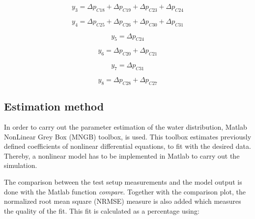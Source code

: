 \vspace{4mm}
\begin{equation}
    y_3 = \Delta p_{C18} + \Delta p_{C19} + \Delta p_{C23} + \Delta p_{C24} 
\end{equation}

\vspace{4mm}
\begin{equation}
    y_4 = \Delta p_{C25} + \Delta p_{C26} + \Delta p_{C30} + \Delta p_{C31}  
\end{equation}

\vspace{4mm}
\begin {equation}
    y_5 = \Delta p_{C24}
\end{equation}

\vspace{4mm}
\begin {equation}
    y_6 = \Delta p_{C20} + \Delta p_{C21} 
\end{equation}

\vspace{4mm}
\begin {equation}
   y_7 = \Delta p_{C31}
\end{equation}

\vspace{4mm}
\begin {equation}
   y_8 = \Delta p_{C28} + \Delta p_{C27} 
\end{equation}

 
\subsection{Estimation method} 
\label{MatlabScript}

In order to carry out the parameter estimation of the water distribution, Matlab NonLinear Grey Box (MNGB) toolbox\cite{MatlabGreyBox}, is used. This toolbox estimates previously defined coefficients of nonlinear differential equations, to fit with the desired data. 
Thereby, a nonlinear model has to be implemented in Matlab to carry out the simulation. 

The comparison between the test setup measurements and the model output is done with the Matlab function \textit{compare}. Together with the comparison 
plot, the normalized root mean square (NRMSE) measure is also added which measures the quality of the fit. This fit is calculated as a percentage \cite{MatlabFit} using:

